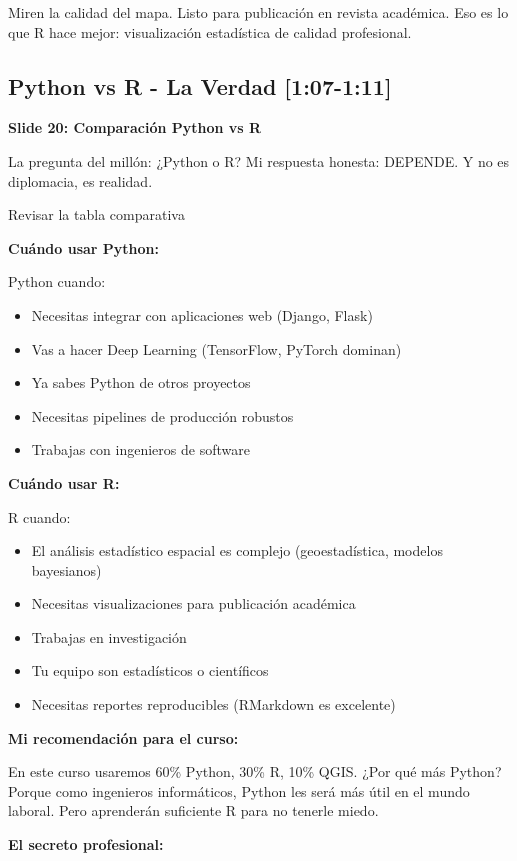 \documentclass[11pt,a4paper]{article}
\newcommand{\tiempo}[1]{\textcolor{timecolor}{\faIcon{clock} \textbf{[#1]}}}
\newcommand{\decir}[1]{\begin{tcolorbox}[colback=blue!5,colframe=usachblue,title={\faIcon{microphone} DECIR}]#1\end{tcolorbox}}
\newcommand{\hacer}[1]{\begin{tcolorbox}[colback=green!5,colframe=green!50!black,title={\faIcon{hand-point-right} HACER}]#1\end{tcolorbox}}
\begin{document}
\decir{Miren la calidad del mapa. Listo para publicación en revista académica. Eso es lo que R hace mejor: visualización estadística de calidad profesional.}

\subsection{Python vs R - La Verdad \tiempo{1:07-1:11}}

\textbf{Slide 20: Comparación Python vs R}

\decir{La pregunta del millón: ¿Python o R? Mi respuesta honesta: DEPENDE. Y no es diplomacia, es realidad.}

\hacer{Revisar la tabla comparativa}

\textbf{Cuándo usar Python:}

\decir{Python cuando:
\begin{itemize}
    \item Necesitas integrar con aplicaciones web (Django, Flask)
    \item Vas a hacer Deep Learning (TensorFlow, PyTorch dominan)
    \item Ya sabes Python de otros proyectos
    \item Necesitas pipelines de producción robustos
    \item Trabajas con ingenieros de software
\end{itemize}}

\textbf{Cuándo usar R:}

\decir{R cuando:
\begin{itemize}
    \item El análisis estadístico espacial es complejo (geoestadística, modelos bayesianos)
    \item Necesitas visualizaciones para publicación académica
    \item Trabajas en investigación
    \item Tu equipo son estadísticos o científicos
    \item Necesitas reportes reproducibles (RMarkdown es excelente)
\end{itemize}}

\textbf{Mi recomendación para el curso:}

\decir{En este curso usaremos 60\% Python, 30\% R, 10\% QGIS. ¿Por qué más Python? Porque como ingenieros informáticos, Python les será más útil en el mundo laboral. Pero aprenderán suficiente R para no tenerle miedo.}

\textbf{El secreto profesional:}
\end{document}
